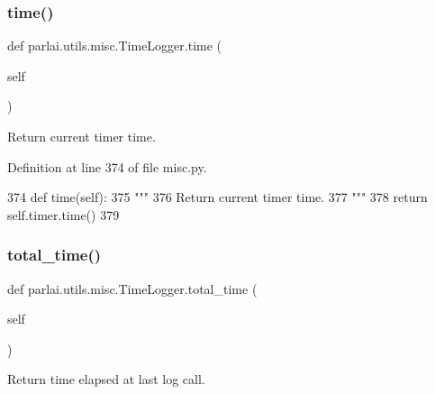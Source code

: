 \mbox{\label{classparlai_1_1utils_1_1misc_1_1TimeLogger_aa8e859dc10c12159501bbf545ca62a51}} 
\subsubsection{\texorpdfstring{time()}{time()}}
{\footnotesize\ttfamily def parlai.\+utils.\+misc.\+Time\+Logger.\+time (\begin{DoxyParamCaption}\item[{}]{self }\end{DoxyParamCaption})}

\begin{DoxyVerb}Return current timer time.
\end{DoxyVerb}
 

Definition at line 374 of file misc.\+py.


\begin{DoxyCode}
374     \textcolor{keyword}{def }time(self):
375         \textcolor{stringliteral}{"""}
376 \textcolor{stringliteral}{        Return current timer time.}
377 \textcolor{stringliteral}{        """}
378         \textcolor{keywordflow}{return} self.timer.time()
379 
\end{DoxyCode}
\mbox{\label{classparlai_1_1utils_1_1misc_1_1TimeLogger_a18d3faec4442ed5b313c88d566f43b2d}} 
\subsubsection{\texorpdfstring{total\+\_\+time()}{total\_time()}}
{\footnotesize\ttfamily def parlai.\+utils.\+misc.\+Time\+Logger.\+total\+\_\+time (\begin{DoxyParamCaption}\item[{}]{self }\end{DoxyParamCaption})}

\begin{DoxyVerb}Return time elapsed at last log call.
\end{DoxyVerb}
 

